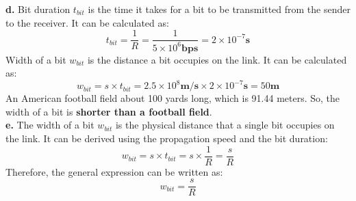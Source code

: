 \documentclass{cshwk}
\begin{document}
\noindent\textbf{d.} Bit duration $t_{bit}$ is the time it takes for a bit to be transmitted from the sender to the receiver. It can be calculated as:
$$
    t_{bit} = \frac{1}{R} = \frac{1}{5 \times 10^6 \mathbf{bps}} = 2 \times 10^{-7} \mathbf{s}
$$
Width of a bit $w_{bit}$ is the distance a bit occupies on the link. It can be calculated as:
$$
    w_{bit} = s \times t_{bit} = 2.5 \times 10^8 \mathbf{m/s} \times 2 \times 10^{-7} \mathbf{s} = 50 \mathbf{m}
$$
An American football field about 100 yards long, which is 91.44 meters. So, the width of a bit is \textbf{shorter than a football field}.
\\

\noindent\textbf{e.} The width of a bit $w_{bit}$ is the physical distance that a single bit occupies on the link. It can be derived using the propagation speed and the bit duration:
$$
    w_{bit} = s \times t_{bit} = s \times \frac{1}{R} = \frac{s}{R}
$$
Therefore, the general expression can be written as:
$$
    \boxed{
        w_{bit} = \frac{s}{R}
    }
$$
\end{document}
